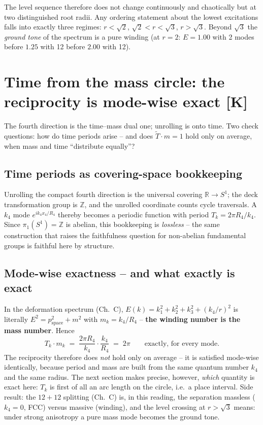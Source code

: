 The level sequence therefore does not change continuously and
chaotically but at two distinguished root radii. Any ordering
statement about the lowest excitations falls into exactly three
regimes: $r < \sqrt2$, $\sqrt2 < r < \sqrt3$, $r > \sqrt3$. Beyond
$\sqrt3$ the \emph{ground tone} of the spectrum is a pure winding
(at $r = 2$: $E = 1.00$ with 2 modes before $1.25$ with 12 before
$2.00$ with 12).

\chapter{Time from the mass circle: the reciprocity is mode-wise exact [K]}

The fourth direction is the time--mass dual one; unrolling is onto
time. Two check questions: how do time periods arise -- and does
$\tilde T\cdot m = 1$ hold only on average, when mass and time
\enquote{distribute equally}?

\section{Time periods as covering-space bookkeeping}

Unrolling the compact fourth direction is the universal covering
$\mathbb{R}\to S^1$; the deck transformation group is
$\mathbb{Z}$, and the unrolled coordinate counts cycle
traversals. A $k_4$ mode $e^{ik_4x_4/R_4}$ thereby becomes a
periodic function with period $T_k = 2\pi R_4/k_4$. Since
$\pi_1(S^1) = \mathbb{Z}$ is abelian, this bookkeeping is
\emph{lossless} -- the same construction that raises the
faithfulness question for non-abelian fundamental groups is
faithful here by structure.

\section{Mode-wise exactness -- and what exactly is exact}

In the deformation spectrum (Ch.~C),
$E(k) = k_1^2+k_2^2+k_3^2 + (k_4/r)^2$ is literally
$E^2 = p_\text{space}^2 + m^2$ with $m_k = k_4/R_4$ --
\textbf{the winding number is the mass number}. Hence
\begin{equation}
  T_k \cdot m_k \;=\; \frac{2\pi R_4}{k_4}\cdot\frac{k_4}{R_4}
  \;=\; 2\pi
  \qquad\text{exactly, for every mode.}
\end{equation}
The reciprocity therefore does \emph{not} hold only on average --
it is satisfied mode-wise identically, because period and mass are
built from the same quantum number $k_4$ and the same radius. The
next section makes precise, however, \emph{which} quantity is exact
here: $T_k$ is first of all an arc length on the circle, i.e.\ a
place interval. Side
result: the $12+12$ splitting (Ch.~C) is, in this reading, the
separation massless ($k_4 = 0$, FCC) versus massive (winding), and
the level crossing at $r > \sqrt3$ means: under strong anisotropy
a pure mass mode becomes the ground tone.

